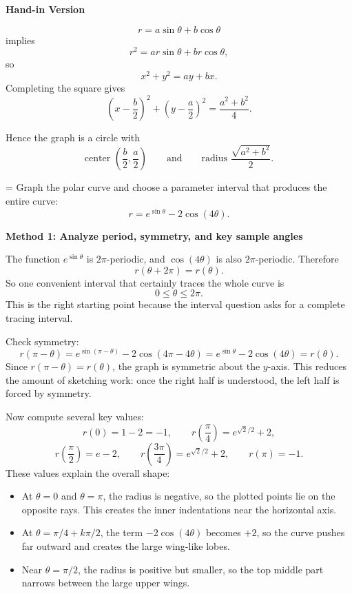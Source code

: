 \documentclass[a4paper,12pt,twocolumn]{article}
\newlength{\problemnumberwidth}
\newenvironment{solutionbox}{\begin{framed}}{\end{framed}}
\newcommand{\problem}[3]{%
  \Needspace{10\baselineskip}%
  \phantomsection\label{#1}%
  \par\vspace{0.8em}%
  \noindent
  \hangindent=\problemnumberwidth
  \hangafter=1
  \makebox[\problemnumberwidth][l]{\textbf{#2.}}#3\par
}
\begin{document}
\begin{solutionbox}
\textbf{Hand-in Version}

\[
r=a\sin\theta+b\cos\theta
\]
implies
\[
r^2=ar\sin\theta+br\cos\theta,
\]
so
\[
x^2+y^2=ay+bx.
\]
Completing the square gives
\[
\left(x-\frac{b}{2}\right)^2+\left(y-\frac{a}{2}\right)^2
=\frac{a^2+b^2}{4}.
\]

Hence the graph is a circle with
\[
\boxed{\text{center } \left(\frac{b}{2},\frac{a}{2}\right)}
\qquad\text{and}\qquad
\boxed{\text{radius } \frac{\sqrt{a^2+b^2}}{2}.}
\]
\end{solutionbox}

\problem{prob:10-3-61}{61}{Graph the polar curve and choose a parameter interval that produces the entire curve:
\[
r=e^{\sin\theta}-2\cos(4\theta).
\]}

\begin{solutionbox}
\textbf{Method 1: Analyze period, symmetry, and key sample angles}

\begin{steps}
\item The function \(e^{\sin\theta}\) is \(2\pi\)-periodic, and \(\cos(4\theta)\) is also \(2\pi\)-periodic. Therefore
\[
r(\theta+2\pi)=r(\theta).
\]
So one convenient interval that certainly traces the whole curve is
\[
0\le \theta\le 2\pi.
\]
This is the right starting point because the interval question asks for a complete tracing interval.

\item Check symmetry:
\[
r(\pi-\theta)
=e^{\sin(\pi-\theta)}-2\cos(4\pi-4\theta)
=e^{\sin\theta}-2\cos(4\theta)
=r(\theta).
\]
Since \(r(\pi-\theta)=r(\theta)\), the graph is symmetric about the \(y\)-axis. This reduces the amount of sketching work: once the right half is understood, the left half is forced by symmetry.

\item Now compute several key values:
\[
r(0)=1-2=-1,
\qquad
r\!\left(\frac{\pi}{4}\right)=e^{\sqrt2/2}+2,
\]
\[
r\!\left(\frac{\pi}{2}\right)=e-2,
\qquad
r\!\left(\frac{3\pi}{4}\right)=e^{\sqrt2/2}+2,
\qquad
r(\pi)=-1.
\]
These values explain the overall shape:
\begin{itemize}[leftmargin=*]
\item At \(\theta=0\) and \(\theta=\pi\), the radius is negative, so the plotted points lie on the opposite rays. This creates the inner indentations near the horizontal axis.
\item At \(\theta=\pi/4+k\pi/2\), the term \(-2\cos(4\theta)\) becomes \(+2\), so the curve pushes far outward and creates the large wing-like lobes.
\item Near \(\theta=\pi/2\), the radius is positive but smaller, so the top middle part narrows between the large upper wings.
\end{itemize}


\end{steps}
\end{solutionbox}
\end{document}

